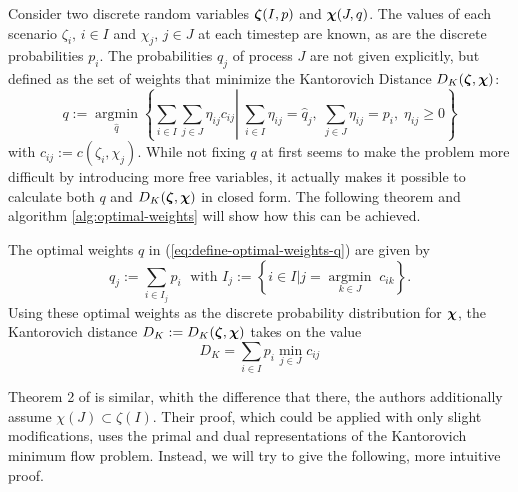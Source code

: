 Consider two discrete random variables $\boldsymbol\zeta(I,p)$ and $\boldsymbol\chi(J,q)$.
The values of each scenario $\zeta_i,\, i\in I$ and $\chi_j,\, j\in J$ at each timestep are known, as are the discrete probabilities $p_i$.
The probabilities $q_j$ of process $J$ are not given explicitly, but defined as the set of weights that minimize the Kantorovich Distance $D_K(\boldsymbol\zeta,\boldsymbol\chi)$:
\begin{equation}
  \label{eq:define-optimal-weights-q}
  q := \underset{\hat{q}}{\operatorname{argmin}}\left\{\sum_{i\in I}\sum_{j\in J}\eta_{ij}c_{ij}\left|\; \sum_{i\in I}\eta_{ij} = \hat{q}_j,\; \sum_{j\in J}\eta_{ij} = p_i,\;\eta_{ij}\geq 0\right.\right\}
\end{equation}
with $c_{ij} := c(\zeta_i,\chi_j)$.
While not fixing $q$ at first seems to make the problem more difficult by introducing more free variables, it actually makes it possible to calculate both $q$ and $D_K(\boldsymbol\zeta,\boldsymbol\chi)$ in closed form.
The following theorem and algorithm \ref{alg:optimal-weights} will show how this can be achieved.
\begin{thm}
  \label{thm:optimal-weights}
  The optimal weights $q$ in (\ref{eq:define-optimal-weights-q}) are given by
  \begin{equation}
    \label{eq:optimal-weights-in-thm}
    q_j := \sum_{i\in I_j} p_i\;\text{ with } I_j:=\left\{i\in I| j = \underset{k\in J}{\operatorname{argmin}}\; c_{ik}\right\}.
  \end{equation}
  Using these optimal weights as the discrete probability distribution for $\boldsymbol\chi$, the Kantorovich distance $D_K:=D_K(\boldsymbol\zeta,\boldsymbol\chi)$ takes on the value
  \begin{equation}
    \label{eq:define-Dk-optimalweights-thm}
    D_K = \sum_{i\in I}p_i\min\limits_{j\in J}c_{ij}
  \end{equation}
\end{thm}
Theorem 2 of  is similar, whith the difference that there, the authors additionally assume $\chi(J)\subset \zeta(I)$.
Their proof, which could be applied with only slight modifications, uses the primal and dual representations of the Kantorovich minimum flow problem.
Instead, we will try to give the following, more intuitive proof.
